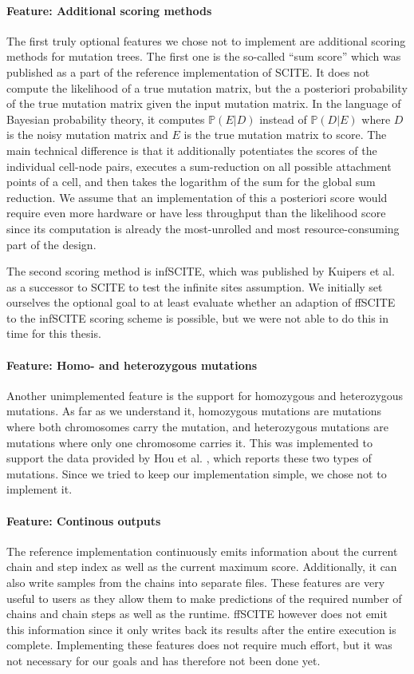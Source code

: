 \paragraph{Feature: Additional scoring methods}
The first truly optional features we chose not to implement are additional scoring methods for mutation trees. The first one is the so-called ``sum score'' which was published as a part of the reference implementation of \ac{SCITE}. It does not compute the likelihood of a true mutation matrix, but the a posteriori probability of the true mutation matrix given the input mutation matrix. In the language of Bayesian probability theory, it computes $\mathbb{P}(E|D)$ instead of $\mathbb{P}(D|E)$ where $D$ is the noisy mutation matrix and $E$ is the true mutation matrix to score. The main technical difference is that it additionally potentiates the scores of the individual cell-node pairs, executes a sum-reduction on all possible attachment points of a cell, and then takes the logarithm of the sum for the global sum reduction. We assume that an implementation of this a posteriori score would require even more hardware or have less throughput than the likelihood score since its computation is already the most-unrolled and most resource-consuming part of the design.

The second scoring method is \ac{infSCITE}, which was published by Kuipers et al. \cite{kuipers2017single} as a successor to \ac{SCITE} to test the infinite sites assumption. We initially set ourselves the optional goal to at least evaluate whether an adaption of \ac{ffSCITE} to the \ac{infSCITE} scoring scheme is possible, but we were not able to do this in time for this thesis.

\paragraph{Feature: Homo- and heterozygous mutations}
Another unimplemented feature is the support for homozygous and heterozygous mutations. As far as we understand it, homozygous mutations are mutations where both chromosomes carry the mutation, and heterozygous mutations are mutations where only one chromosome carries it. This was implemented to support the data provided by Hou et al. \cite{hou2012single}, which reports these two types of mutations. Since we tried to keep our implementation simple, we chose not to implement it.

\paragraph{Feature: Continous outputs}
The reference implementation continuously emits information about the current chain and step index as well as the current maximum score. Additionally, it can also write samples from the chains into separate files. These features are very useful to users as they allow them to make predictions of the required number of chains and chain steps as well as the runtime. \ac{ffSCITE} however does not emit this information since it only writes back its results after the entire execution is complete. Implementing these features does not require much effort, but it was not necessary for our goals and has therefore not been done yet.

